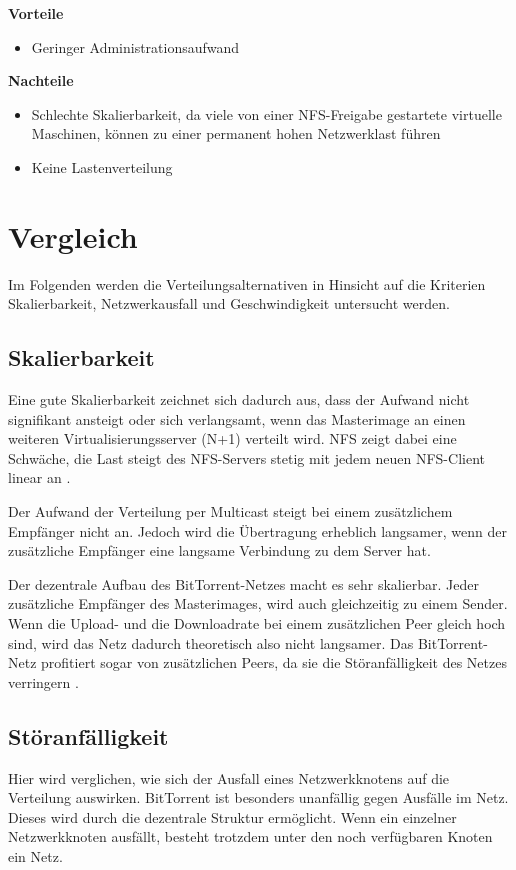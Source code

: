
\textbf{Vorteile}
\begin{itemize}
 \item Geringer Administrationsaufwand
\end{itemize}

\textbf{Nachteile}
\begin{itemize}
 \item Schlechte Skalierbarkeit, da viele von einer NFS-Freigabe gestartete virtuelle Maschinen, können zu einer permanent hohen Netzwerklast führen
 \item Keine Lastenverteilung
\end{itemize}

\section{Vergleich}
Im Folgenden werden die Verteilungsalternativen in Hinsicht auf die Kriterien Skalierbarkeit, Netzwerkausfall und Geschwindigkeit untersucht werden.

\subsection{Skalierbarkeit}
Eine gute Skalierbarkeit zeichnet sich dadurch aus, dass der Aufwand nicht signifikant ansteigt oder sich verlangsamt, wenn das Masterimage an einen weiteren Virtualisierungsserver (N+1) verteilt wird. NFS zeigt dabei eine Schwäche, die Last steigt des NFS-Servers stetig mit jedem neuen NFS-Client linear an \cite{nfsharmful}. 

Der Aufwand der Verteilung per Multicast steigt bei einem zusätzlichem Empfänger nicht an. Jedoch wird die Übertragung erheblich langsamer, wenn der zusätzliche Empfänger eine langsame Verbindung zu dem Server hat. 

Der dezentrale Aufbau des BitTorrent-Netzes macht es sehr skalierbar. Jeder zusätzliche Empfänger des Masterimages, wird auch gleichzeitig zu einem Sender. Wenn die Upload- und die Downloadrate bei einem zusätzlichen Peer gleich hoch sind, wird das Netz dadurch theoretisch also nicht langsamer. Das BitTorrent-Netz profitiert sogar von zusätzlichen Peers, da sie die Störanfälligkeit des Netzes verringern \cite{btscalability}.

\subsection{Störanfälligkeit}
Hier wird verglichen, wie sich der Ausfall eines Netzwerkknotens auf die Verteilung auswirken. BitTorrent ist besonders unanfällig gegen Ausfälle im Netz. Dieses wird durch die dezentrale Struktur ermöglicht. Wenn ein einzelner Netzwerkknoten ausfällt, besteht trotzdem unter den noch verfügbaren Knoten ein Netz. 

